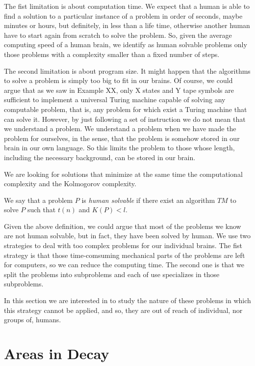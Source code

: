 The fist limitation is about computation time. We expect that a human is able to find a solution to a particular instance of a problem in order of seconds, maybe minutes or hours, but definitely, in less than a life time, otherwise another human have to start again from scratch to solve the problem. So, given the average computing speed of a human brain, we identify as human solvable problems only those problems with a complexity smaller than a fixed number of steps.

The second limitation is about program size. It might happen that the algorithms to solve a problem is simply too big to fit in our brains. Of course, we could argue that {\color{red} as we saw in Example XX, only X states and Y tape symbols} are sufficient to implement a universal Turing machine capable of solving any computable problem, that is, any problem for which exist a Turing machine that can solve it. However, by just following a set of instruction we do not mean that we understand a problem. We understand a problem when we have made the problem for ourselves, in the sense, that the problem is somehow stored in our brain in our own language. So this limits the problem to those whose length, including the necessary background, can be stored in our brain.

We are looking for solutions that minimize at the same time the computational complexity and the Kolmogorov complexity.

\begin{definition}
We say that a problem $P$ is \emph{human solvable} if there exist an algorithm $TM$ to solve $P$ such that $t(n)$ and $K(P) < l$.
\end{definition}

Given the above definition, we could argue that most of the problems we know are not human solvable, but in fact, they have been solved by human. We use two strategies to deal with too complex problems for our individual brains. The fist strategy is that those time-comsuming mechanical parts of the problems are left for computers, so we can reduce the computing time. The second one is that we split the problems into subproblems and each of use specializes in those subproblems.

In this section we are interested in to study the nature of these problems in which this strategy cannot be applied, and so, they are out of reach of individual, nor groups of, humans.

%
%

\section{Areas in Decay}

